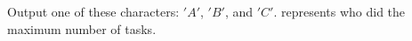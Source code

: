 Output one of these characters: $'A'$, $'B'$, and $'C'$. 
represents who did the maximum number of tasks.